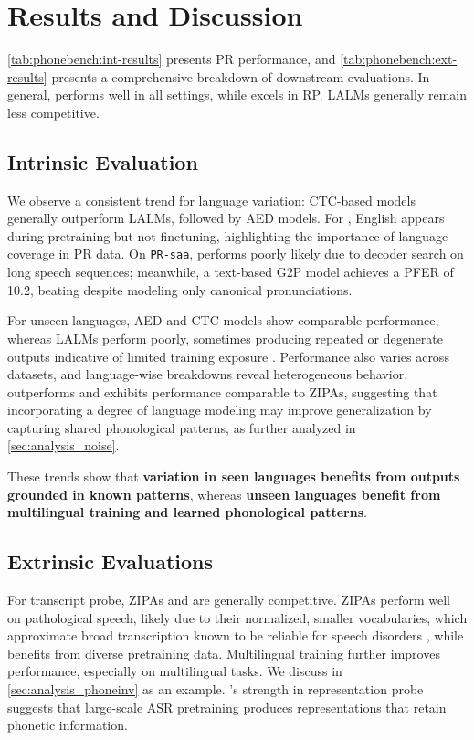 \section{Results and Discussion}
\autoref{tab:phonebench:int-results} presents PR performance, and \autoref{tab:phonebench:ext-results} presents a comprehensive breakdown of downstream evaluations.
In general, \zipactcns performs well in all settings, while \whisper excels in RP.
LALMs generally remain less competitive.




\subsection{Intrinsic Evaluation}
\label{sec:prperf}
We observe a consistent trend for language variation: CTC-based models generally outperform LALMs, followed by AED models. 
For \mipa, English appears during pretraining but not finetuning, highlighting the importance of language coverage in PR data. 
On \texttt{PR-saa}, \powsm performs poorly likely due to decoder search on long speech sequences; meanwhile, a text-based G2P model \cite{zhu2022charsiu-g2p} achieves a PFER of 10.2, beating \gemini despite modeling only canonical pronunciations.

For unseen languages, AED and CTC models show comparable performance, whereas LALMs perform poorly, sometimes producing repeated or degenerate outputs indicative of limited training exposure \cite{neuraltextdegen}. 
Performance also varies across datasets, and language-wise breakdowns reveal heterogeneous behavior. 
\powsm outperforms \powsmctc and exhibits performance comparable to ZIPAs, suggesting that incorporating a degree of language modeling may improve generalization by capturing shared phonological patterns, as further analyzed in \autoref{sec:analysis_noise}.

These trends show that \textbf{variation in seen languages benefits from outputs grounded in known patterns}, whereas \textbf{unseen languages benefit from multilingual training and learned phonological patterns}.



\subsection{Extrinsic Evaluations}
\label{sec:extrinsic}
For transcript probe, ZIPAs and \xlsrf are generally competitive. 
ZIPAs perform well on pathological speech, likely due to their normalized, smaller vocabularies, which approximate broad transcription known to be reliable for speech disorders \cite{shriberg1991reliability}, 
while \xlsrf benefits from diverse pretraining data. 
Multilingual training further improves performance, especially on multilingual tasks.
We discuss \pinv in \autoref{sec:analysis_phoneinv} as an example.
\whisper's strength in representation probe  suggests that large-scale ASR pretraining produces representations that retain phonetic information. 

